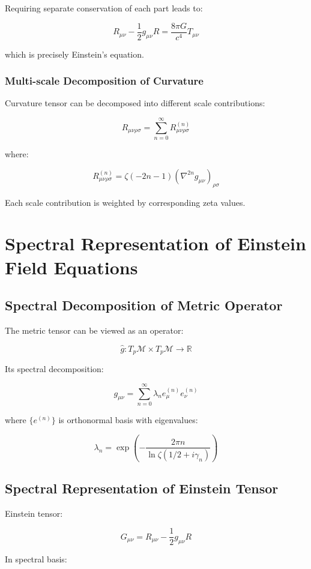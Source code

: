 \documentclass[12pt,a4paper]{article}
\begin{document}
Requiring separate conservation of each part leads to:

$$R_{\mu\nu} - \frac{1}{2} g_{\mu\nu} R = \frac{8\pi G}{c^4} T_{\mu\nu}$$

which is precisely Einstein's equation.

\subsubsection{Multi-scale Decomposition of Curvature}

Curvature tensor can be decomposed into different scale contributions:

$$R_{\mu\nu\rho\sigma} = \sum_{n=0}^{\infty} R_{\mu\nu\rho\sigma}^{(n)}$$

where:

$$R_{\mu\nu\rho\sigma}^{(n)} = \zeta(-2n-1) \left(\nabla^{2n} g_{\mu\nu}\right)_{\rho\sigma}$$

Each scale contribution is weighted by corresponding zeta values.

\section{Spectral Representation of Einstein Field Equations}

\subsection{Spectral Decomposition of Metric Operator}

The metric tensor can be viewed as an operator:

$$\hat{g}: T_p\mathcal{M} \times T_p\mathcal{M} \rightarrow \mathbb{R}$$

Its spectral decomposition:

$$g_{\mu\nu} = \sum_{n=0}^{\infty} \lambda_n e_\mu^{(n)} e_\nu^{(n)}$$

where $\{e^{(n)}\}$ is orthonormal basis with eigenvalues:

$$\lambda_n = \exp\left(-\frac{2\pi n}{\ln \zeta(1/2 + i\gamma_n)}\right)$$

\subsection{Spectral Representation of Einstein Tensor}

Einstein tensor:

$$G_{\mu\nu} = R_{\mu\nu} - \frac{1}{2} g_{\mu\nu} R$$

In spectral basis:
\end{document}
